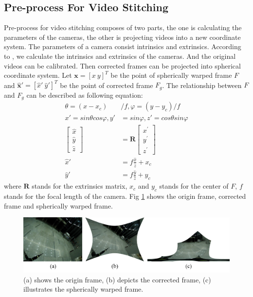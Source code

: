 \documentclass[conference]{IEEEtran}
\begin{document}
\subsection{Pre-process For Video Stitching}
\label{ssec:Pre-prepared}
Pre-process for video stitching composes of two parts, the one is calculating the parameters of the cameras, the other is projecting videos into a new coordinate
system. The parameters of a camera consist intrinsics and extrinsics. 
According to \cite{zhang2000flexible}, we calculate the intrinsics and extrinsics of the cameras. And the original videos can be calibrated.
Then corrected frames can be projected into spherical coordinate system.
Let $\textbf{x} = [x \ y]^T$ be the point of spherically
warped frame $F$ and $\hat{\textbf{x}}' = [\hat{x}' \ \hat{y}']^T$ be the point of corrected frame $F_g$.
The relationship between $F$ and $F_g$ can be described as following equation:
\begin{equation}
\begin{aligned}
\theta =\left(x-x_{c}\right) &/ f , \varphi =\left(y -y_{c}\right) / f \\
x'=sin\theta cos\varphi, y'&=sin\varphi, z'=cos\theta sin\varphi \\
\left[ \begin{array}{l}{\hat{x}} \\ {\hat{y}} \\ {\hat{z}}\end{array}\right]&=\textbf{R} \left[ \begin{array}{l}{x^{\prime}} \\ {y^{\prime}} \\ {z^{\prime}}\end{array}\right]\\
\hat{x}'&=f\frac{\hat{x}}{\hat{z}}+x_c\\
\hat{y}'&=f\frac{\hat{y}}{\hat{z}}+y_c
\end{aligned}
\end{equation}
where $\textbf{R}$ stands for the extrinsics matrix, $x_c$ and $y_c$ stands for the center of $F$, $f$ stands for the focal length of the camera.
Fig \ref{fig:ori_cal_pro} shows the origin frame, 
corrected frame and spherically warped frame. 

\begin{figure}[t]
\centering
\includegraphics[scale=0.23]{picture40.png}
\caption{(a) shows the origin frame, (b) depicts the corrected frame, (c) illustrates the spherically warped frame.}
\label{fig:ori_cal_pro}
\end{figure}
\end{document}
